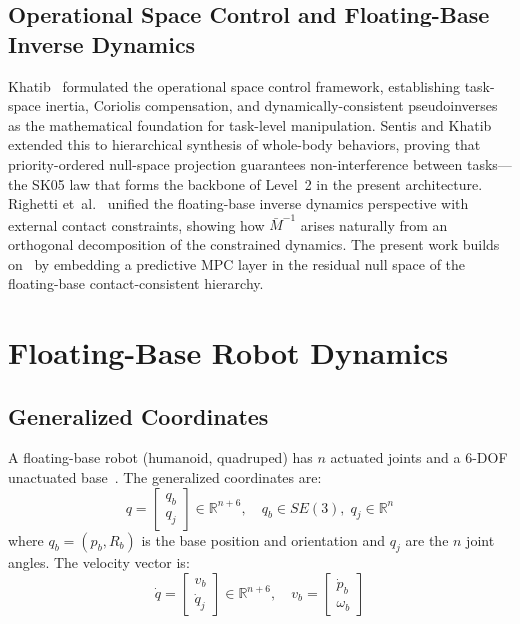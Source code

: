 \documentclass[journal]{IEEEtran}
\newcommand{\Mbar}{\bar{M}^{-1}}
\begin{document}
\subsection{Operational Space Control and Floating-Base Inverse Dynamics}

Khatib~\cite{khatib1987unified} formulated the operational space control
framework, establishing task-space inertia, Coriolis compensation, and
dynamically-consistent pseudoinverses as the mathematical foundation for
task-level manipulation.
Sentis and Khatib~\cite{sentis2005synthesis} extended this to hierarchical
synthesis of whole-body behaviors, proving that priority-ordered null-space
projection guarantees non-interference between tasks---the SK05 law that
forms the backbone of Level~2 in the present architecture.
Righetti et~al.~\cite{righetti2011inverse} unified the floating-base
inverse dynamics perspective with external contact constraints, showing how
$\Mbar$ arises naturally from an orthogonal decomposition of the constrained
dynamics.
The present work builds on~\cite{khatib1987unified,sentis2005synthesis,righetti2011inverse}
by embedding a predictive MPC layer in the residual null space of the
floating-base contact-consistent hierarchy.

\section{Floating-Base Robot Dynamics}\label{sec:dynamics}

\subsection{Generalized Coordinates}

A floating-base robot (humanoid, quadruped) has $n$ actuated joints and a
6-DOF unactuated base~\cite{righetti2011inverse}. The generalized
coordinates are:
\begin{equation}\label{eq:gencoord}
  q = \begin{bmatrix} q_b \\ q_j \end{bmatrix} \in \mathbb{R}^{n+6},
  \quad q_b \in SE(3),\; q_j \in \mathbb{R}^n
\end{equation}
where $q_b=(p_b,R_b)$ is the base position and orientation and $q_j$ are
the $n$ joint angles. The velocity vector is:
\begin{equation}\label{eq:vel}
  \dot{q} = \begin{bmatrix} v_b \\ \dot{q}_j \end{bmatrix} \in \mathbb{R}^{n+6},
  \quad v_b = \begin{bmatrix} \dot{p}_b \\ \omega_b \end{bmatrix}
\end{equation}
\end{document}
